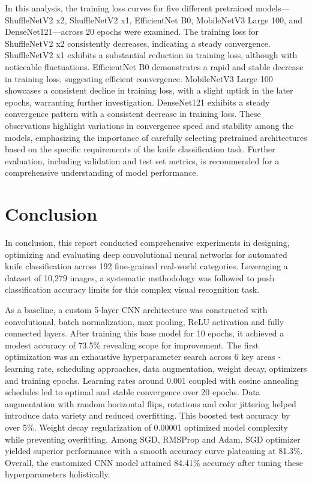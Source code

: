 \documentclass[10pt,twocolumn,letterpaper]{article}
\begin{document}
In this analysis, the training loss curves for five different pretrained models—ShuffleNetV2 x2, ShuffleNetV2 x1,
EfficientNet B0, MobileNetV3 Large 100, and DenseNet121—across 20 epochs were examined. The training loss for
ShuffleNetV2 x2 consistently decreases, indicating a steady convergence. ShuffleNetV2 x1 exhibits a substantial
reduction in training loss, although with noticeable fluctuations. EfficientNet B0 demonstrates a rapid and stable
decrease in training loss, suggesting efficient convergence. MobileNetV3 Large 100 showcases a consistent decline in
training loss, with a slight uptick in the later epochs, warranting further investigation. DenseNet121 exhibits a
steady convergence pattern with a consistent decrease in training loss. These observations highlight variations in
convergence speed and stability among the models, emphasizing the importance of carefully selecting pretrained
architectures based on the specific requirements of the knife classification task. Further evaluation, including
validation and test set metrics, is recommended for a comprehensive understanding of model performance.

\section{Conclusion}
\label{sec:conclusion}

In conclusion, this report conducted comprehensive experiments in designing, optimizing and evaluating deep convolutional neural networks for automated knife classification across 192 fine-grained real-world categories. Leveraging a dataset of 10,279 images, a systematic methodology was followed to push classification accuracy limits for this complex visual recognition task.

As a baseline, a custom 5-layer CNN architecture was constructed with convolutional, batch normalization, max pooling, ReLU activation and fully connected layers. After training this base model for 10 epochs, it achieved a modest accuracy of 73.5\% revealing scope for improvement. The first optimization was an exhaustive hyperparameter search across 6 key areas - learning rate, scheduling approaches, data augmentation, weight decay, optimizers and training epochs. Learning rates around 0.001 coupled with cosine annealing schedules led to optimal and stable convergence over 20 epochs. Data augmentation with random horizontal flips, rotations and color jittering helped introduce data variety and reduced overfitting. This boosted test accuracy by over 5\%. Weight decay regularization of 0.00001 optimized model complexity while preventing overfitting. Among SGD, RMSProp and Adam, SGD optimizer yielded superior performance with a smooth accuracy curve plateauing at 81.3\%. Overall, the customized CNN model attained 84.41\% accuracy after tuning these hyperparameters holistically.
\end{document}

